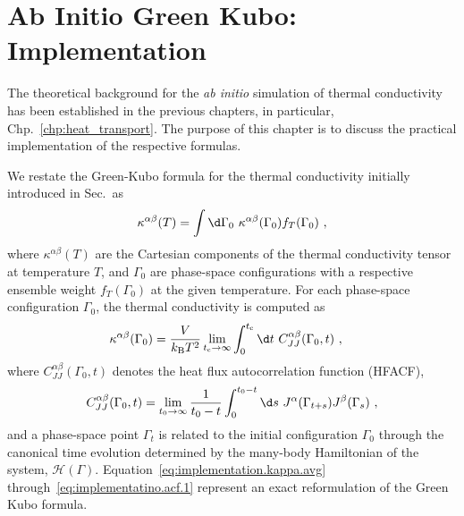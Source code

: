 \chapter{Ab Initio Green Kubo: Implementation}
\label{chp:implementation}
\newcommand{\tcut}{t_{\rm c}}
\newcommand{\teff}{t^{\rm eff}_0}

The theoretical background for the \emph{ab initio} simulation of thermal conductivity has been established in the previous chapters, in particular, Chp.~\ref{chp:heat_transport}. The purpose of this chapter is to discuss the practical implementation of the respective formulas. 

We restate the Green-Kubo formula for the thermal conductivity initially introduced in Sec.\, as
\begin{align}
	\kappa^{\alpha \beta} (T)
		= \int \d \Gamma_0 ~ \kappa^{\alpha \beta} (\Gamma_0) f_T (\Gamma_0) ~,
	\label{eq:implementation.kappa.avg}
\end{align}
where $\kappa^{\alpha \beta} (T)$ are the Cartesian components of the thermal conductivity tensor at temperature $T$, and $\Gamma_0$ are phase-space configurations with a respective ensemble weight $f_T (\Gamma_0)$ at the given temperature. For each phase-space configuration $\Gamma_0$, the thermal conductivity is computed as
\begin{align}
	\kappa^{\alpha \beta} (\Gamma_0)
		&=
		\frac{V}{k_{\rm B} T^2} 
		\lim_{t_{\rm c} \to \infty}
		\int_{0}^{\tcut} 
		\d t ~ C_{JJ}^{\alpha \beta} (\Gamma_0, t)~,
	\label{eq:implementatino.kappa.1}
\end{align}
where $	C^{\alpha \beta}_{J J} (\Gamma_0, t)$ denotes the heat flux autocorrelation function (HFACF),
\begin{align}
	C^{\alpha \beta}_{J J} (\Gamma_0, t)
		=
		\lim_{t_{0} \to \infty}
		\frac{1}{t_0 - t}
		\int_{0}^{t_{\rm 0} - t} 
		\d s ~ J^\alpha (\Gamma_{t + s}) J^\beta (\Gamma_s)~,
	\label{eq:implementatino.acf.1}
\end{align}
and a phase-space point $\Gamma_t$ is related to the initial configuration $\Gamma_0$ through the canonical time evolution determined by the many-body Hamiltonian of the system, $\mathcal H (\Gamma)$. Equation~\ref{eq:implementation.kappa.avg} through~\ref{eq:implementatino.acf.1} represent an exact reformulation of the Green Kubo formula.


